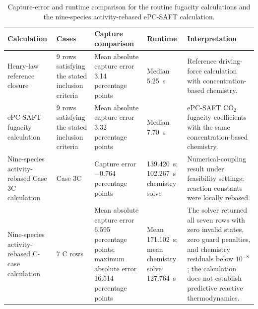 \begin{table}[pos=htbp]
  \centering
  \caption{Capture-error and runtime comparison for the routine fugacity calculations and the nine-species activity-rebased ePC-SAFT calculation.}
  \label{tab:full-ionic-speciation-timing}
  \footnotesize
  \begin{tabularx}{\textwidth}{@{}p{} p{} p{} p{} X@{}}
    \toprule
    Calculation & Cases & Capture comparison & Runtime & Interpretation \\
    \midrule
        Henry-law reference closure & 9 rows satisfying the stated inclusion criteria & Mean absolute capture error 3.14 percentage points & Median \qty{5.25}{s} & Reference driving-force calculation with concentration-based chemistry. \\
        ePC-SAFT fugacity calculation & 9 rows satisfying the stated inclusion criteria & Mean absolute capture error 3.32 percentage points & Median \qty{7.70}{s} & ePC-SAFT CO$_2$ fugacity coefficients with the same concentration-based chemistry. \\
        Nine-species activity-rebased Case 3C calculation & Case 3C & Capture error $-0.764$ percentage points & \qty{139.420}{s}; \qty{102.267}{s} chemistry solve & Numerical-coupling result under feasibility settings; reaction constants were locally rebased. \\
        Nine-species activity-rebased C-case calculation & 7 C rows & Mean absolute capture error 6.595 percentage points; maximum absolute error 16.514 percentage points & Mean \qty{171.102}{s}; mean chemistry solve \qty{127.764}{s} & The solver returned all seven rows with zero invalid states, zero guard penalties, and chemistry residuals below $10^{-8}$; the calculation does not establish predictive reactive thermodynamics. \\
        \bottomrule
  \end{tabularx}
\end{table}
